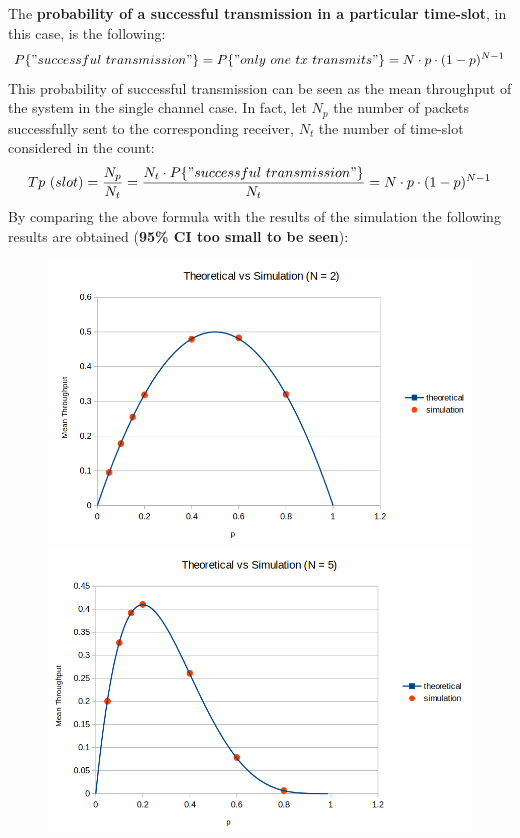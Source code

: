 \noindent The \textbf{probability of a successful transmission in a particular time-slot}, in this case, is the following:
\begin{equation}
	P\{" successful\ transmission"\} = P\{"only\ one\ tx\ transmits"\} = N\cdot p \cdot(1-p)^{N-1}
\end{equation}
This probability of successful transmission can be seen as the mean throughput of the system in the single channel case. In fact, let $N_{p}$ the number of packets successfully sent to the corresponding receiver, $N_{t}$ the number of time-slot considered in the count:
\begin{align*}
Tp\ (slot) = \frac{N_{p}}{N_{t}} = \frac{N_{t}\cdot P\{"successful\ transmission"\}}{N_{t}} = N\cdot p\cdot (1-p)^{N-1}
\end{align*}
By comparing the above formula with the results of the simulation the following results are obtained (\textbf{95\% CI too small to be seen}):
\begin{figure}[H]
	\begin{minipage}[b]{0.55\textwidth}
		\includegraphics[width=\textwidth]{img/SecondVerificationN2.png}
	\end{minipage}
	\begin{minipage}[b]{0.55\textwidth}
		\includegraphics[width=\textwidth]{img/SecondVerificationN5.png}
	\end{minipage}
\end{figure}

